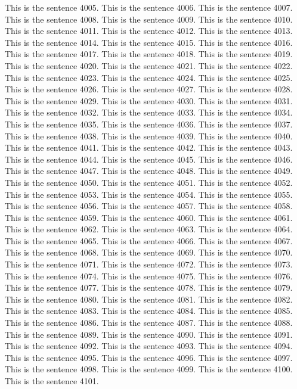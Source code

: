 \documentclass{article}
\begin{document}
This is the sentence 4005.
This is the sentence 4006.
This is the sentence 4007.
This is the sentence 4008.
This is the sentence 4009.
This is the sentence 4010.
This is the sentence 4011.
This is the sentence 4012.
This is the sentence 4013.
This is the sentence 4014.
This is the sentence 4015.
This is the sentence 4016.
This is the sentence 4017.
This is the sentence 4018.
This is the sentence 4019.
This is the sentence 4020.
This is the sentence 4021.
This is the sentence 4022.
This is the sentence 4023.
This is the sentence 4024.
This is the sentence 4025.
This is the sentence 4026.
This is the sentence 4027.
This is the sentence 4028.
This is the sentence 4029.
This is the sentence 4030.
This is the sentence 4031.
This is the sentence 4032.
This is the sentence 4033.
This is the sentence 4034.
This is the sentence 4035.
This is the sentence 4036.
This is the sentence 4037.
This is the sentence 4038.
This is the sentence 4039.
This is the sentence 4040.
This is the sentence 4041.
This is the sentence 4042.
This is the sentence 4043.
This is the sentence 4044.
This is the sentence 4045.
This is the sentence 4046.
This is the sentence 4047.
This is the sentence 4048.
This is the sentence 4049.
This is the sentence 4050.
This is the sentence 4051.
This is the sentence 4052.
This is the sentence 4053.
This is the sentence 4054.
This is the sentence 4055.
This is the sentence 4056.
This is the sentence 4057.
This is the sentence 4058.
This is the sentence 4059.
This is the sentence 4060.
This is the sentence 4061.
This is the sentence 4062.
This is the sentence 4063.
This is the sentence 4064.
This is the sentence 4065.
This is the sentence 4066.
This is the sentence 4067.
This is the sentence 4068.
This is the sentence 4069.
This is the sentence 4070.
This is the sentence 4071.
This is the sentence 4072.
This is the sentence 4073.
This is the sentence 4074.
This is the sentence 4075.
This is the sentence 4076.
This is the sentence 4077.
This is the sentence 4078.
This is the sentence 4079.
This is the sentence 4080.
This is the sentence 4081.
This is the sentence 4082.
This is the sentence 4083.
This is the sentence 4084.
This is the sentence 4085.
This is the sentence 4086.
This is the sentence 4087.
This is the sentence 4088.
This is the sentence 4089.
This is the sentence 4090.
This is the sentence 4091.
This is the sentence 4092.
This is the sentence 4093.
This is the sentence 4094.
This is the sentence 4095.
This is the sentence 4096.
This is the sentence 4097.
This is the sentence 4098.
This is the sentence 4099.
This is the sentence 4100.
This is the sentence 4101.
\end{document}
